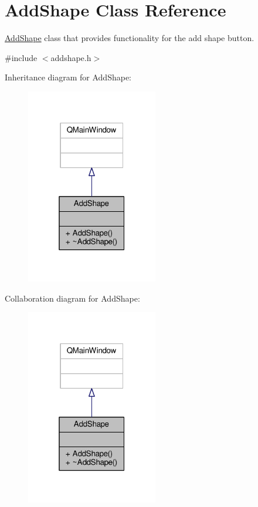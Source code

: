 \hypertarget{classAddShape}{}\section{Add\+Shape Class Reference}
\label{classAddShape}


\hyperlink{classAddShape}{Add\+Shape} class that provides functionality for the add shape button.  




{\ttfamily \#include $<$addshape.\+h$>$}



Inheritance diagram for Add\+Shape\+:\nopagebreak
\begin{figure}[H]
\begin{center}
\leavevmode
\includegraphics[width=163pt]{classAddShape__inherit__graph}
\end{center}
\end{figure}


Collaboration diagram for Add\+Shape\+:\nopagebreak
\begin{figure}[H]
\begin{center}
\leavevmode
\includegraphics[width=163pt]{classAddShape__coll__graph}
\end{center}
\end{figure}
